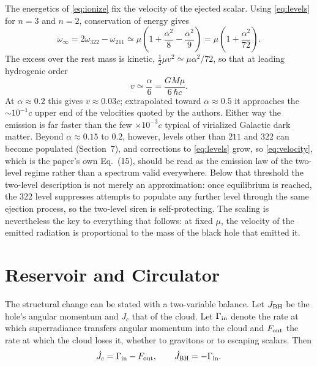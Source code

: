 \documentclass[11pt]{article}
\begin{document}
The energetics of \eqref{eq:ionize} fix the velocity of the ejected scalar. Using \eqref{eq:levels} for $n=3$ and $n=2$, conservation of energy gives
\begin{equation}
\omega_{\infty} = 2\omega_{322} - \omega_{211}
\simeq \mu\left(1 + \frac{\alpha^{2}}{8} - \frac{\alpha^{2}}{9}\right)
= \mu\left(1 + \frac{\alpha^{2}}{72}\right).
\end{equation}
The excess over the rest mass is kinetic, $\tfrac12 \mu v^{2} \simeq \mu\alpha^{2}/72$, so that at leading hydrogenic order
\begin{equation}
v \simeq \frac{\alpha}{6} = \frac{G M \mu}{6\,\hbar c}.
\label{eq:velocity}
\end{equation}
At $\alpha \approx 0.2$ this gives $v \approx 0.03c$; extrapolated toward $\alpha \approx 0.5$ it approaches the $\sim 10^{-1}c$ upper end of the velocities quoted by the authors. Either way the emission is far faster than the few $\times 10^{-3}c$ typical of virialized Galactic dark matter. Beyond $\alpha \approx 0.15$ to $0.2$, however, levels other than $211$ and $322$ can become populated (Section~7), and corrections to \eqref{eq:levels} grow, so \eqref{eq:velocity}, which is the paper's own Eq.~(15), should be read as the emission law of the two-level regime rather than a spectrum valid everywhere. Below that threshold the two-level description is not merely an approximation: once equilibrium is reached, the $322$ level suppresses attempts to populate any further level through the same ejection process, so the two-level siren is self-protecting. The scaling is nevertheless the key to everything that follows: at fixed $\mu$, the velocity of the emitted radiation is proportional to the mass of the black hole that emitted it.

\section{Reservoir and Circulator}

The structural change can be stated with a two-variable balance. Let $J_{\rm BH}$ be the hole's angular momentum and $J_{c}$ that of the cloud. Let $\Gamma_{\rm in}$ denote the rate at which superradiance transfers angular momentum into the cloud and $F_{\rm out}$ the rate at which the cloud loses it, whether to gravitons or to escaping scalars. Then
\begin{equation}
\dot J_{c} = \Gamma_{\rm in} - F_{\rm out}, \qquad \dot J_{\rm BH} = -\Gamma_{\rm in}.
\end{equation}
\end{document}
